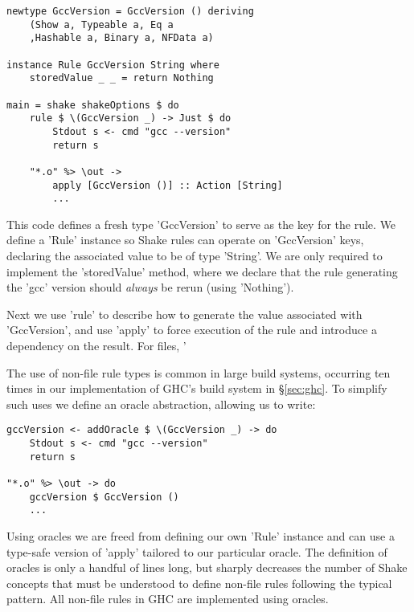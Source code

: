 \begin{lstlisting}
newtype GccVersion = GccVersion () deriving
    (Show a, Typeable a, Eq a
    ,Hashable a, Binary a, NFData a)

instance Rule GccVersion String where
    storedValue _ _ = return Nothing

main = shake shakeOptions $ do
    rule $ \(GccVersion _) -> Just $ do
        Stdout s <- cmd "gcc --version"
        return s

    "*.o" %> \out ->
        apply [GccVersion ()] :: Action [String]
        ...
\end{lstlisting}

This code defines a fresh type \lst'GccVersion' to serve as the key for the rule. We define a \lst'Rule' instance so Shake rules can operate on \lst'GccVersion' keys, declaring the associated value to be of type \lst'String'. We are only required to implement the \lst'storedValue' method, where we declare that the rule generating the \lst'gcc' version should \emph{always} be rerun (using \lst'Nothing').

Next we use \lst'rule' to describe how to generate the value associated with \lst'GccVersion', and use \lst'apply' to force execution of the rule and introduce a dependency on the result. For files, \lst'%

The use of non-file rule types is common in large build systems, occurring ten times in our implementation of GHC's build system in \S\ref{sec:ghc}. To simplify such uses we define an oracle abstraction, allowing us to write:

\begin{lstlisting}
gccVersion <- addOracle $ \(GccVersion _) -> do
    Stdout s <- cmd "gcc --version"
    return s

"*.o" %> \out -> do
    gccVersion $ GccVersion ()
    ...
\end{lstlisting}

Using oracles we are freed from defining our own \lst'Rule' instance and can use a type-safe version of \lst'apply' tailored to our particular oracle. The definition of oracles is only a handful of lines long, but sharply decreases the number of Shake concepts that must be understood to define non-file rules following the typical pattern. All non-file rules in GHC are implemented using oracles.


